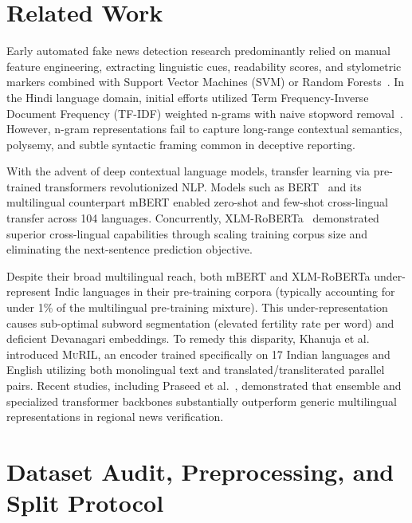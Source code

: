 \documentclass[11pt,a4paper]{article}
\begin{document}
\section{Related Work}
\label{sec:related}

Early automated fake news detection research predominantly relied on manual feature engineering, extracting linguistic cues, readability scores, and stylometric markers combined with Support Vector Machines (SVM) or Random Forests~\cite{shu2017fake}. In the Hindi language domain, initial efforts utilized Term Frequency-Inverse Document Frequency (TF-IDF) weighted n-grams with naive stopword removal~\cite{praseed2023hindi}. However, n-gram representations fail to capture long-range contextual semantics, polysemy, and subtle syntactic framing common in deceptive reporting.

With the advent of deep contextual language models, transfer learning via pre-trained transformers revolutionized NLP. Models such as BERT~\cite{devlin2019bert} and its multilingual counterpart mBERT enabled zero-shot and few-shot cross-lingual transfer across 104 languages. Concurrently, XLM-RoBERTa~\cite{conneau2020unsupervised} demonstrated superior cross-lingual capabilities through scaling training corpus size and eliminating the next-sentence prediction objective. 

Despite their broad multilingual reach, both mBERT and XLM-RoBERTa under-represent Indic languages in their pre-training corpora (typically accounting for under 1\% of the multilingual pre-training mixture). This under-representation causes sub-optimal subword segmentation (elevated fertility rate per word) and deficient Devanagari embeddings. To remedy this disparity, Khanuja et al.~\cite{khanuja2021muril} introduced \textsc{MuRIL}, an encoder trained specifically on 17 Indian languages and English utilizing both monolingual text and translated/transliterated parallel pairs. Recent studies, including Praseed et al.~\cite{praseed2023hindi}, demonstrated that ensemble and specialized transformer backbones substantially outperform generic multilingual representations in regional news verification.

\section{Dataset Audit, Preprocessing, and Split Protocol}
\label{sec:dataset}
\end{document}
